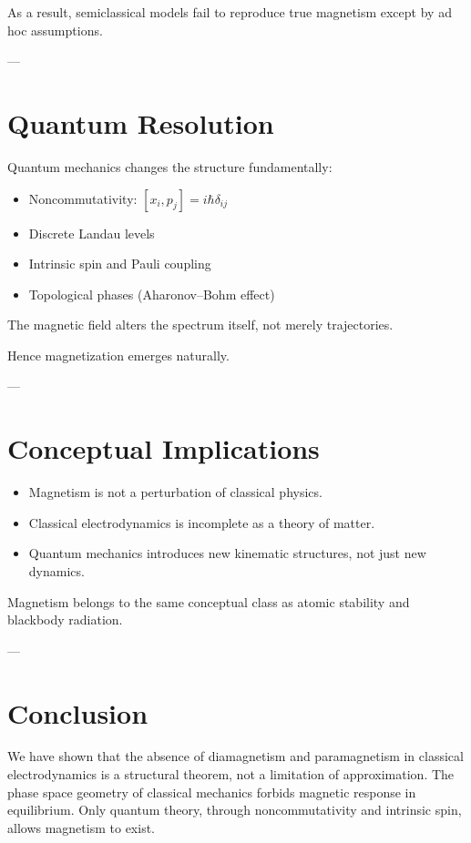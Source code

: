 \documentclass[11pt]{article}
\begin{document}
As a result, semiclassical models fail to reproduce true magnetism except by ad hoc assumptions.

---

\section{Quantum Resolution}

Quantum mechanics changes the structure fundamentally:

\begin{itemize}
\item Noncommutativity: $[x_i,p_j]=i\hbar\delta_{ij}$
\item Discrete Landau levels
\item Intrinsic spin and Pauli coupling
\item Topological phases (Aharonov--Bohm effect)
\end{itemize}

The magnetic field alters the spectrum itself, not merely trajectories.

Hence magnetization emerges naturally.

---

\section{Conceptual Implications}

\begin{itemize}
\item Magnetism is not a perturbation of classical physics.
\item Classical electrodynamics is incomplete as a theory of matter.
\item Quantum mechanics introduces new kinematic structures, not just new dynamics.
\end{itemize}

Magnetism belongs to the same conceptual class as atomic stability and blackbody radiation.

---

\section{Conclusion}

We have shown that the absence of diamagnetism and paramagnetism in classical electrodynamics is a structural theorem, not a limitation of approximation. The phase space geometry of classical mechanics forbids magnetic response in equilibrium. Only quantum theory, through noncommutativity and intrinsic spin, allows magnetism to exist.
\end{document}
